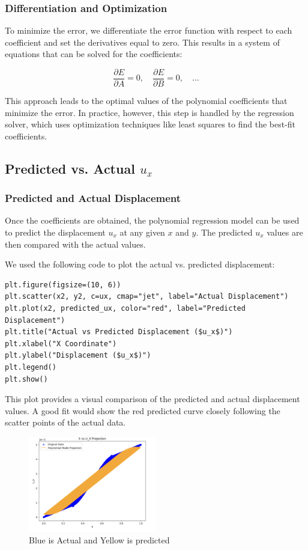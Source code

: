 \documentclass[fleqn,10pt]{olplainarticle}
\begin{document}
\subsubsection{Differentiation and Optimization}
To minimize the error, we differentiate the error function with respect to each coefficient and set the derivatives equal to zero. This results in a system of equations that can be solved for the coefficients:

\[
\frac{\partial E}{\partial A} = 0, \quad \frac{\partial E}{\partial B} = 0, \quad \dots
\]

This approach leads to the optimal values of the polynomial coefficients that minimize the error. In practice, however, this step is handled by the regression solver, which uses optimization techniques like least squares to find the best-fit coefficients.

\subsection{Predicted vs. Actual $u_x$}
\subsubsection{Predicted and Actual Displacement}
Once the coefficients are obtained, the polynomial regression model can be used to predict the displacement $u_x$ at any given $x$ and $y$. The predicted $u_x$ values are then compared with the actual values.

We used the following code to plot the actual vs. predicted displacement:

\begin{verbatim}
plt.figure(figsize=(10, 6))
plt.scatter(x2, y2, c=ux, cmap="jet", label="Actual Displacement")
plt.plot(x2, predicted_ux, color="red", label="Predicted Displacement")
plt.title("Actual vs Predicted Displacement ($u_x$)")
plt.xlabel("X Coordinate")
plt.ylabel("Displacement ($u_x$)")
plt.legend()
plt.show()
\end{verbatim}

This plot provides a visual comparison of the predicted and actual displacement values. A good fit would show the red predicted curve closely following the scatter points of the actual data.

\begin{figure}[h!]
\centering
\includegraphics[width=0.5\textwidth]{Photo/8.png}
\caption{Blue is Actual and Yellow is predicted}
\end{figure}
\end{document}
